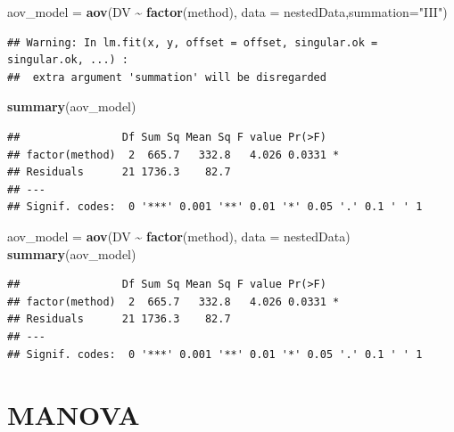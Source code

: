 \documentclass[
]{ctexart}
\newenvironment{Shaded}{\begin{snugshade}}{\end{snugshade}}
\newcommand{\AttributeTok}[1]{\textcolor[rgb]{0.13,0.29,0.53}{#1}}
\newcommand{\FunctionTok}[1]{\textcolor[rgb]{0.13,0.29,0.53}{\textbf{#1}}}
\newcommand{\NormalTok}[1]{#1}
\newcommand{\OtherTok}[1]{\textcolor[rgb]{0.56,0.35,0.01}{#1}}
\newcommand{\SpecialCharTok}[1]{\textcolor[rgb]{0.81,0.36,0.00}{\textbf{#1}}}
\newcommand{\StringTok}[1]{\textcolor[rgb]{0.31,0.60,0.02}{#1}}
\begin{document}
\begin{Shaded}
\begin{Highlighting}[]
\NormalTok{aov\_model }\OtherTok{=} \FunctionTok{aov}\NormalTok{(DV }\SpecialCharTok{\textasciitilde{}} \FunctionTok{factor}\NormalTok{(method), }
                \AttributeTok{data =}\NormalTok{ nestedData,}\AttributeTok{summation=}\StringTok{"III"}\NormalTok{)}
\end{Highlighting}
\end{Shaded}

\begin{verbatim}
## Warning: In lm.fit(x, y, offset = offset, singular.ok = singular.ok, ...) :
##  extra argument 'summation' will be disregarded
\end{verbatim}

\begin{Shaded}
\begin{Highlighting}[]
\FunctionTok{summary}\NormalTok{(aov\_model)}
\end{Highlighting}
\end{Shaded}

\begin{verbatim}
##                Df Sum Sq Mean Sq F value Pr(>F)  
## factor(method)  2  665.7   332.8   4.026 0.0331 *
## Residuals      21 1736.3    82.7                 
## ---
## Signif. codes:  0 '***' 0.001 '**' 0.01 '*' 0.05 '.' 0.1 ' ' 1
\end{verbatim}

\begin{Shaded}
\begin{Highlighting}[]
\NormalTok{aov\_model }\OtherTok{=} \FunctionTok{aov}\NormalTok{(DV }\SpecialCharTok{\textasciitilde{}} \FunctionTok{factor}\NormalTok{(method), }
                \AttributeTok{data =}\NormalTok{ nestedData)}
\FunctionTok{summary}\NormalTok{(aov\_model)}
\end{Highlighting}
\end{Shaded}

\begin{verbatim}
##                Df Sum Sq Mean Sq F value Pr(>F)  
## factor(method)  2  665.7   332.8   4.026 0.0331 *
## Residuals      21 1736.3    82.7                 
## ---
## Signif. codes:  0 '***' 0.001 '**' 0.01 '*' 0.05 '.' 0.1 ' ' 1
\end{verbatim}

\hypertarget{manova}{%
\section{MANOVA}\label{manova}}
\end{document}
